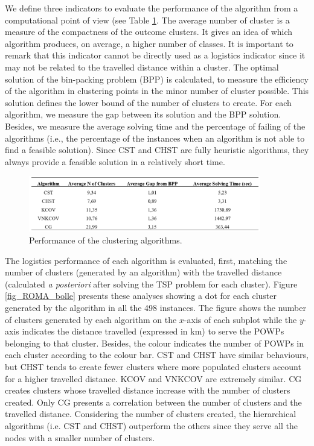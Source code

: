We define three indicators to evaluate the performance of the algorithm from a computational point of view (see Table \ref{tab_ROMA_application}. The average number of cluster is a measure of the compactness of the outcome clusters. It gives an idea of which algorithm produces, on average, a higher number of classes. It is important to remark that this indicator cannot be directly used as a logistics indicator since it may not be related to the travelled distance within a cluster. The optimal solution of the bin-packing problem (BPP) is calculated, to measure the efficiency of the algorithm in clustering points in the minor number of cluster possible. This solution defines the lower bound of the number of clusters to create. For each algorithm, we measure the gap between its solution and the BPP solution. Besides, we measure the average solving time and the percentage of failing of the algorithms (i.e., the percentage of the instances when an algorithm is not able to find a feasible solution). Since CST and CHST are fully heuristic algorithms, they always provide a feasible solution in a relatively short time.

\begin{figure}[hbt!]
\centering
\includegraphics[width=0.9\textwidth]{SectionDistribution/design_figures/tab_ROMA_application.png}
\captionsetup{type=table}
\caption{Performance of the clustering algorithms.}
\label{tab_ROMA_application}
\end{figure}

The logistics performance of each algorithm is evaluated, first, matching the number of clusters (generated by an algorithm)  with the travelled distance (calculated \textit{a posteriori} after solving the TSP problem for each cluster). Figure \ref{fig_ROMA_bolle} presents these analyses showing a dot for each cluster generated by the algorithm in all the 498 instances. The figure shows the number of clusters generated by each algorithm on the $x$-axis of each subplot while the $y$-axis indicates the distance travelled (expressed in km) to serve the POWPs belonging to that cluster. Besides, the colour indicates the number of POWPs in each cluster according to the colour bar. CST and CHST have similar behaviours, but CHST tends to create fewer clusters where more populated clusters account for a higher travelled distance. KCOV and VNKCOV are extremely similar. CG creates clusters whose travelled distance increase with the number of clusters created. Only CG presents a correlation between the number of clusters and the travelled distance. Considering the number of clusters created, the hierarchical algorithms (i.e. CST and CHST) outperform the others since they serve all the nodes with a smaller number of clusters.

